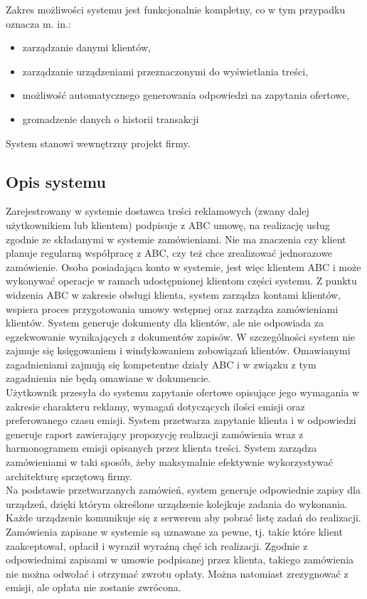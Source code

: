 \documentclass[10pt,a4paper,titlepage]{article} %
\begin{document}
		Zakres możliwości systemu jest funkcjonalnie kompletny, co w tym przypadku
		oznacza m. in.:\\
		
		\begin{itemize}
		\item zarządzanie danymi klientów,
		\item zarządzanie urządzeniami przeznaczonymi do wyświetlania treści,
		\item możliwość automatycznego generowania odpowiedzi na zapytania
		ofertowe,
		\item gromadzenie danych o historii transakcji
		\end{itemize}

		
		System stanowi wewnętrzny projekt firmy.
	
		\subsection{Opis systemu}
		Zarejestrowany w systemie dostawca treści reklamowych (zwany dalej użytkownikiem
		lub klientem) podpisuje z ABC umowę, na realizację usług zgodnie ze składanymi
		w systemie zamówieniami. Nie ma znaczenia czy klient planuje regularną
		współpracę z ABC, czy też chce zrealizować jednorazowe zamówienie. Osoba posiadająca
		konto w systemie, jest więc klientem ABC i może wykonywać operacje w ramach
		udostępnionej klientom części systemu. Z punktu widzenia ABC w zakresie obsługi
		klienta, system zarządza kontami klientów, wspiera proces przygotowania umowy wstępnej
		oraz zarządza zamówieniami klientów. System generuje dokumenty dla klientów, ale
		nie odpowiada za egzekwowanie wynikających z dokumentów zapisów. W szczególności
		system nie zajmuje się księgowaniem i windykowaniem zobowiązań klientów.
		Omawianymi zagadnieniami zajmują się kompetentne działy ABC i w związku z tym
		zagadnienia nie będą omawiane w dokumencie.\\
		
		Użytkownik przesyła do systemu zapytanie ofertowe opisujące jego wymagania w zakresie
		charakteru reklamy, wymagań dotyczących ilości emisji oraz preferowanego
		czasu emisji. System przetwarza zapytanie klienta i w odpowiedzi generuje
		raport zawierający propozycję realizacji zamówienia wraz z harmonogramem
		emisji opisanych przez klienta treści. System zarządza zamówieniami w
		taki sposób, żeby maksymalnie efektywnie wykorzystywać architekturę
		sprzętową firmy.\\

		Na podstawie przetwarzanych zamówień, system generuje odpowiednie zapisy
		dla urządzeń, dzięki którym określone urządzenie kolejkuje zadania do
		wykonania. Każde urządzenie komunikuje się z serwerem aby pobrać listę
		zadań do realizacji. Zamówienia zapisane w systemie są uznawane za pewne,
		tj. takie które klient zaakceptował, opłacił i wyraził wyraźną chęć ich realizacji.
		Zgodnie z odpowiednimi zapisami w umowie podpisanej przez klienta, takiego
		zamówienia nie można odwołać i otrzymać zwrotu opłaty. Można natomiast zrezygnować
		z emisji, ale opłata nie zostanie zwrócona.\\
		
\end{document}
